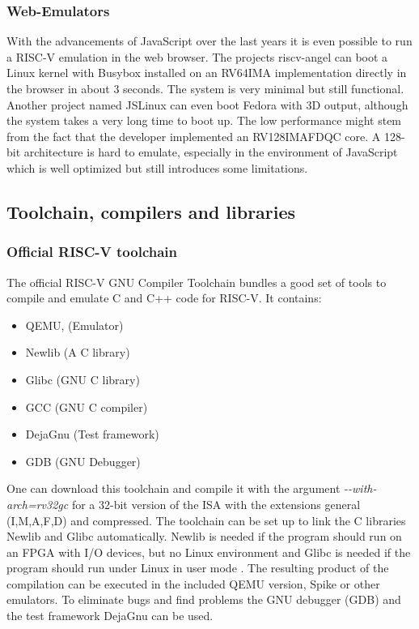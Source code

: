 \subsubsection{Web-Emulators}
With the advancements of JavaScript over the last years
it is even possible to run a RISC-V emulation in the
web browser. The projects riscv-angel \cite{github_riscv-angel}
can boot a Linux kernel with Busybox
installed on an RV64IMA implementation
directly in the browser in about 3 seconds.
The system is very minimal but still functional.
Another project named JSLinux \cite{bellard_jslinux}
can even boot Fedora with 3D output,
although the system takes a very
long time to boot up. The low performance might
stem from the fact that the developer implemented
an RV128IMAFDQC core. A 128-bit architecture is
hard to emulate, especially in the environment
of JavaScript which is well optimized but still
introduces some limitations.

\subsection{Toolchain, compilers and libraries}
\subsubsection{Official RISC-V toolchain}
The official RISC-V GNU Compiler Toolchain
\cite{github_risc-v_toolchain} bundles a good set
of tools to compile and emulate C and C++ code for RISC-V.
It contains:
\begin{itemize}
    \item QEMU, (Emulator)
    \item Newlib (A C library)
    \item Glibc (GNU C library)
    \item GCC (GNU C compiler)
    \item DejaGnu (Test framework)
    \item GDB (GNU Debugger)
\end{itemize}
One can download this toolchain and compile
it with the argument
\textit{-{}-with-arch=rv32gc} for a
32-bit version of the ISA with the extensions
general (I,M,A,F,D) and compressed.
The toolchain can be set up to link the C libraries
Newlib and Glibc automatically.
Newlib is needed if the program should run on
an FPGA with I/O devices, but no Linux environment
and Glibc is needed if the program should run
under Linux in user mode \cite{lowrisc_cross-compiler}.
The resulting product of the compilation can
be executed in the included QEMU version, Spike
or other emulators.
To eliminate bugs and find problems the GNU
debugger (GDB) and the test framework DejaGnu can
be used.

